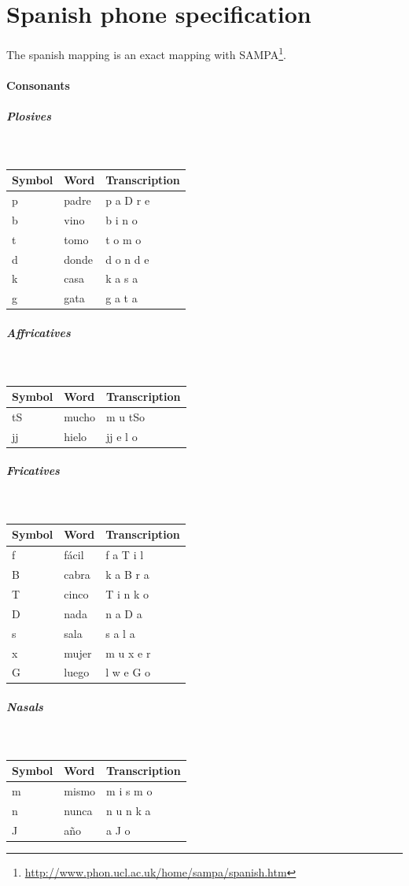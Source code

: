 \documentclass[twoside,a4paper]{book}
\begin{document}
\newpage
\section{Spanish phone specification}
\label{sec:slspanish}
The spanish mapping is an exact mapping with
SAMPA\footnote{\url{http://www.phon.ucl.ac.uk/home/sampa/spanish.htm}}.

\paragraph{Consonants}
\subparagraph{Plosives}\strut\\
\begin{tabular}{lll}
	Symbol & Word & Transcription\\
	\hline
  p & padre & p a D r e\\
  b & vino & b i n o\\
  t & tomo & t o m o\\
  d & donde & d o n d e\\
  k & casa & k a s a\\
  g & gata & g a t a
\end{tabular}

\subparagraph{Affricatives}\strut\\
\begin{tabular}{lll}
	Symbol & Word & Transcription\\
	\hline
	tS & mucho & m u tSo \\
	jj & hielo & jj e l o
\end{tabular}

\subparagraph{Fricatives}\strut\\
\begin{tabular}{lll}
	Symbol & Word & Transcription\\
	\hline
	f & fácil & f a T i l\\
	B & cabra & k a B r a\\
	T & cinco & T i n k o\\
	D & nada & n a D a\\
	s & sala & s a l a \\
	x & mujer & m u x e r\\
	G & luego & l w e G o
\end{tabular}

\subparagraph{Nasals}\strut\\
\begin{tabular}{lll}
	Symbol & Word & Transcription\\
	\hline
	m & mismo & m i s m o\\
	n & nunca & n u n k a\\
	J & año & a J o
\end{tabular}
\end{document}
